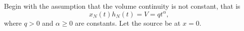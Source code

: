 \documentclass{report}
\begin{document}
	Begin with the assumption that the volume continuity is not constant, that is 
	\begin{equation}
		x_N(t)h_N(t) = V = qt^{\alpha}\text{,}
	\end{equation}
	where \(q > 0\) and \(\alpha \geq 0\) are constants. Let the source be at \(x = 0\).
\end{document}
